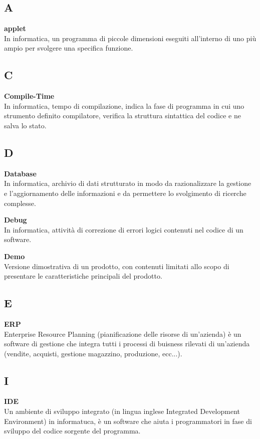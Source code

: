 \subsection*{A}
\textbf{applet}\\
In informatica, un programma di piccole dimensioni eseguiti all'interno di uno più ampio per svolgere una specifica funzione.

\subsection*{C}
\textbf{Compile-Time}\\
In informatica, tempo di compilazione, indica la fase di programma in cui uno strumento definito compilatore, verifica la struttura sintattica del codice e ne salva lo stato.

\subsection*{D}
\textbf{Database}\\
In informatica, archivio di dati strutturato in modo da razionalizzare la gestione e l'aggiornamento delle informazioni e da permettere lo svolgimento di ricerche complesse.

\textbf{Debug}\\
In informatica, attività di correzione di errori logici contenuti nel codice di un software.

\textbf{Demo}\\
Versione dimostrativa di un prodotto, con contenuti limitati allo scopo di presentare le caratteristiche principali del prodotto.

\subsection*{E}
\textbf{ERP}\\
Enterprise Resource Planning (pianificazione delle risorse di un'azienda) è un software di gestione che integra tutti i processi di buisness rilevati di un'azienda (vendite, acquisti, gestione magazzino, produzione, ecc...).

\subsection*{I}
\textbf{IDE}\\
Un ambiente di sviluppo integrato (in lingua inglese Integrated Development Environment) in informatuca, è un software che aiuta i programmatori in fase di sviluppo del codice sorgente del programma.


